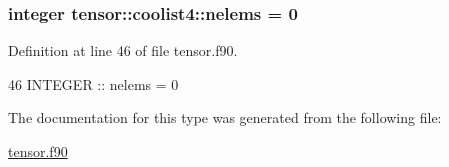 \subsubsection[{\texorpdfstring{nelems}{nelems}}]{\setlength{\rightskip}{0pt plus 5cm}integer tensor\+::coolist4\+::nelems = 0}\hypertarget{structtensor_1_1coolist4_aa3ea70f21c208f3a4ec1b81234e41db1}{}\label{structtensor_1_1coolist4_aa3ea70f21c208f3a4ec1b81234e41db1}


Definition at line 46 of file tensor.\+f90.


\begin{DoxyCode}
46      \textcolor{keywordtype}{INTEGER} :: nelems = 0
\end{DoxyCode}


The documentation for this type was generated from the following file\+:\begin{DoxyCompactItemize}
\item 
\hyperlink{tensor_8f90}{tensor.\+f90}\end{DoxyCompactItemize}
